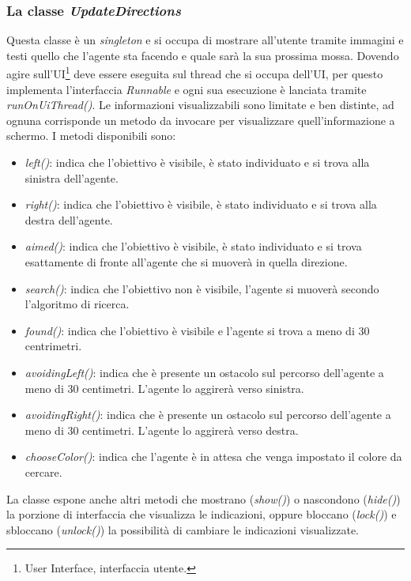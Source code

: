 \subsubsection{La classe \emph{UpdateDirections}}
Questa classe è un \emph{singleton} e si occupa di mostrare all'utente tramite 
immagini e testi quello che l'agente
sta facendo e quale sarà la sua prossima  mossa. Dovendo agire 
sull'UI\footnote{User Interface, interfaccia utente.} deve essere eseguita sul thread
che si occupa dell'UI, per questo implementa l'interfaccia \emph{Runnable} e 
ogni sua esecuzione è lanciata  tramite \emph{runOnUiThread()}. 
Le informazioni visualizzabili sono limitate e ben distinte,
ad ognuna corrisponde un metodo da invocare per visualizzare quell'informazione
a schermo. I metodi disponibili sono: 
\begin{itemize}
	\item \emph{left()}: indica che l'obiettivo è visibile, è stato individuato e si trova alla sinistra dell'agente.
	\item \emph{right()}: indica che l'obiettivo è visibile, è stato individuato e si trova alla destra dell'agente.
	\item \emph{aimed()}: indica che l'obiettivo è visibile, è stato individuato e si trova esattamente di fronte all'agente che si muoverà in quella direzione.
	\item \emph{search()}: indica che l'obiettivo non è visibile, l'agente si muoverà secondo l'algoritmo di ricerca.
	\item \emph{found()}: indica che l'obiettivo è visibile e l'agente si trova a meno di 30 centrimetri.
	\item \emph{avoidingLeft()}: indica che è presente un ostacolo sul percorso dell'agente a meno di 30 centimetri. L'agente lo aggirerà verso sinistra. 
	\item \emph{avoidingRight()}: indica che è presente un ostacolo sul percorso dell'agente a meno di 30 centimetri. L'agente lo aggirerà verso destra.
	\item \emph{chooseColor()}: indica che l'agente è in attesa che venga impostato il colore da cercare. 
\end{itemize}
La classe espone anche altri metodi che mostrano (\emph{show()}) o nascondono 
(\emph{hide()}) la porzione di interfaccia che visualizza le indicazioni, oppure bloccano (\emph{lock()})
e sbloccano (\emph{unlock()}) la possibilità di cambiare le indicazioni visualizzate.

